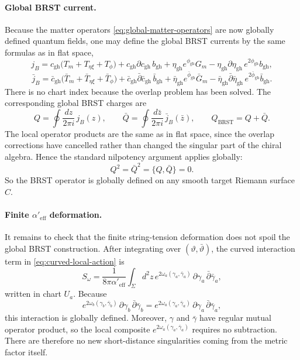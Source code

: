 \documentclass[11pt]{article}
\newcommand{\Aeff}{\alpha'_{\mathrm{eff}}}
\newcommand{\gh}{\mathrm{gh}}
\begin{document}
\paragraph{Global BRST current.}
Because the matter operators \eqref{eq:global-matter-operators} are now globally defined quantum fields, one may define the global BRST currents by the same formulas as in flat space,
\begin{equation}\label{eq:local-brst-current}
j_B
=
c_{\gh}\bigl(T_m+T_{\eta\xi}+T_\phi\bigr)
+c_{\gh}\partial c_{\gh}\,b_{\gh}
+\eta_{\gh}e^{\phi_{\gh}}G_m
-\eta_{\gh}\partial\eta_{\gh}\,e^{2\phi_{\gh}}b_{\gh},
\end{equation}
\begin{equation}\label{eq:global-antiholo-brst}
\bar j_B
=
\bar c_{\gh}\bigl(\bar T_m+\bar T_{\eta\xi}+\bar T_\phi\bigr)
+\bar c_{\gh}\bar\partial \bar c_{\gh}\,\bar b_{\gh}
+\bar\eta_{\gh}e^{\bar\phi_{\gh}}\bar G_m
-\bar\eta_{\gh}\bar\partial\bar\eta_{\gh}\,e^{2\bar\phi_{\gh}}\bar b_{\gh}.
\end{equation}
There is no chart index because the overlap problem has been solved. The corresponding global BRST charges are
\begin{equation}\label{eq:global-brst-charge}
Q=\oint\frac{dz}{2\pi i}\,j_B(z),
\qquad
\bar Q=\oint\frac{d\bar z}{2\pi i}\,\bar j_B(\bar z),
\qquad
Q_{\mathrm{BRST}}=Q+\bar Q.
\end{equation}
The local operator products are the same as in flat space, since the overlap corrections have cancelled rather than changed the singular part of the chiral algebra. Hence the standard nilpotency argument applies globally:
\begin{equation}\label{eq:global-nilpotency}
Q^2=\bar Q^2=\{Q,\bar Q\}=0.
\end{equation}
So the BRST operator is globally defined on any smooth target Riemann surface $C$.

\paragraph{Finite $\Aeff$ deformation.}
It remains to check that the finite string-tension deformation does not spoil the global BRST construction. After integrating over $(\vartheta,\bar\vartheta)$, the curved interaction term in \eqref{eq:curved-local-action} is
\begin{equation}\label{eq:finite-deformation-component}
S_{\omega}
=
\frac{1}{8\pi\Aeff}\int_\Sigma d^2z\,
e^{2\omega_a(\gamma_a,\bar\gamma_a)}\,\partial\gamma_a\,\bar\partial\bar\gamma_a,
\end{equation}
written in chart $U_a$. Because
\begin{equation}\label{eq:interaction-patching}
e^{2\omega_b(\gamma_b,\bar\gamma_b)}\,
\partial\gamma_b\,\bar\partial\bar\gamma_b
=
e^{2\omega_a(\gamma_a,\bar\gamma_a)}\,
\partial\gamma_a\,\bar\partial\bar\gamma_a,
\end{equation}
this interaction is globally defined. Moreover, $\gamma$ and $\bar\gamma$ have regular mutual operator product, so the local composite $e^{2\omega_a(\gamma_a,\bar\gamma_a)}$ requires no subtraction. There are therefore no new short-distance singularities coming from the metric factor itself.
\end{document}
